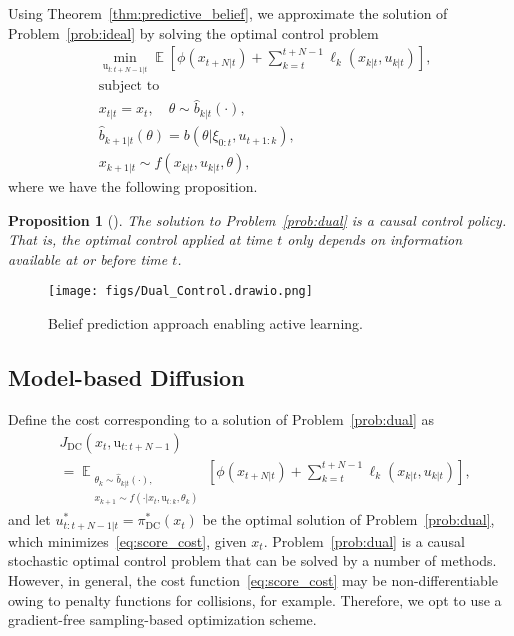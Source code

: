 \documentclass[letterpaper, 10 pt, conference]{IEEEconf}
\newcommand{\Expectation}{\mathop{{}\mathbb{E}}}
\newtheorem{proposition}{Proposition}
\begin{document}
Using Theorem~\ref{thm:predictive_belief}, we approximate the solution of Problem~\eqref{prob:ideal} by solving the optimal control problem
\begin{subequations} \label{prob:dual}
    \begin{align}
        & \min_{\mathrm{u}_{t:t+N-1|t}} \Expectation \left[\phi(x_{t+N|t}) + \sum_{k=t}^{t+N-1} \ell_{k}(x_{k|t}, u_{k|t}) \right], \\
        & \text{subject to} \nonumber\\
        & x_{t|t} = x_{t}, \quad \theta \sim \hat{b}_{k|t}(\cdot), \label{const:dual_dist} \\
        & \hat{b}_{k+1|t}(\theta) = b(\theta | \xi_{0:t}, u_{t+1:k}), \\
        & x_{k+1|t} \sim f(x_{k|t}, u_{k|t}, \theta),
    \end{align}
\end{subequations}
where we have the following proposition.
\begin{proposition}[\cite{knaup2024active}]
    The solution to Problem~\eqref{prob:dual} is a causal control policy. That is, the optimal control applied at time $t$ only depends on information available at or before time $t$.
\end{proposition}

\begin{figure}[th]
    \centering
    \texttt{[image: figs/Dual\_Control.drawio.png]}
    \caption{Belief prediction approach enabling active learning.}
    \label{fig:active_learning}
\end{figure}


\subsection{Model-based Diffusion} \label{sec:proposed_model_based_diffusion}

Define the cost corresponding to a solution of Problem~\eqref{prob:dual} as 
\begin{align}\label{eq:score_cost}
    & J_{\mathrm{DC}}(x_t, \mathrm{u}_{t:t+N-1}) \nonumber\\
    &= \Expectation_{\substack{\theta_{k} \sim \hat{b}_{k|t}(\cdot),\\ x_{k+1} \sim f(\cdot | x_{t}, \mathrm{u}_{t:k}, \theta_{k})}} \left[\phi(x_{t+N|t}) + \sum_{k=t}^{t+N-1} \ell_{k}(x_{k|t}, u_{k|t}) \right],
\end{align}
and let $u_{t:t+N-1|t}^{\ast} = \pi_{\mathrm{DC}}^{\ast}(x_{t})$ be the optimal solution of Problem~\eqref{prob:dual}, which minimizes~\eqref{eq:score_cost}, given $x_{t}$.
Problem~\eqref{prob:dual} is a causal stochastic optimal control problem that can be solved by a number of methods. 
However, in general, the cost function~\eqref{eq:score_cost} may be non-differentiable owing to %
penalty functions for collisions, for example.
Therefore, we opt to use a gradient-free sampling-based optimization scheme.
\end{document}
